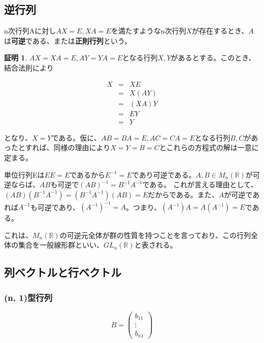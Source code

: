 \documentclass[dvipdfmx,autodetect-engine]{jsarticle}
\theoremstyle{definition}
\newtheorem*{Proof*}{証明}
\begin{document}
\subsection{逆行列}

n次行列Aに対し$AX = E, XA = E$を満たすようなn次行列$X$が存在するとき、$A$は{\bf 可逆}である、または{\bf 正則行列}という。


\begin{Proof*}
$AX = XA = E, AY = YA = E$となる行列$X, Y$があるとする。このとき、結合法則により

\begin{eqnarray*}
X &= &XE \\
  &= &X(AY) \\
  &= &(XA)Y \\
  &= &EY \\
  &= &Y
\end{eqnarray*}

となり、$X = Y$である。仮に、$AB = BA = E, AC = CA = E$となる行列$B, C$があったとすれば、同様の理由により$X = Y = B = C$とこれらの方程式の解は一意に定まる。
\end{Proof*}


単位行列Eは$EE = E$であるから$E^{-1} = E$であり可逆である。$A, B \in M_n(\mathbb{R})$が可逆ならば、$AB$も可逆で$(AB)^{-1} = B^{-1}A^{-1}$である。
これが言える理由として、$(AB)(B^{-1}A^{-1}) = (B^{-1}A^{-1})(AB) = E$だからである。また、$A$が可逆であれば$A^{-1}$も可逆であり、$(A^{-1})^{-1} = A$。つまり、$(A^{-1})A = A(A^{-1}) = E$である。

これは、$M_n(\mathbb{R})$の可逆元全体が群の性質を持つことを言っており、この行列全体の集合を一般線形群といい、$GL_n(\mathbb{R})$と表される。

\subsection{列ベクトルと行ベクトル}

\subsubsection{(n, 1)型行列}

$$
B = \begin{pmatrix}
b_{11} \\
\vdots \\
b_{n1}
\end{pmatrix}
$$
\end{document}

